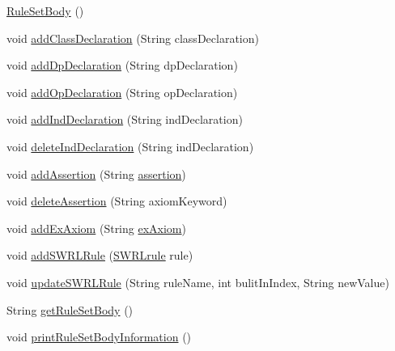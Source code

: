 \begin{DoxyCompactItemize}
\item 
\mbox{\hyperlink{classcom_1_1github_1_1aites_1_1framework_1_1ruleset_1_1_rule_set_body_a33c7fadaf1b5c3a032fb495296660ec9}{Rule\+Set\+Body}} ()
\item 
void \mbox{\hyperlink{classcom_1_1github_1_1aites_1_1framework_1_1ruleset_1_1_rule_set_body_a27d3ea0476987ad4ce3427f783538e42}{add\+Class\+Declaration}} (String class\+Declaration)
\item 
void \mbox{\hyperlink{classcom_1_1github_1_1aites_1_1framework_1_1ruleset_1_1_rule_set_body_ad3eacd53ff944906e42a2935e93bad69}{add\+Dp\+Declaration}} (String dp\+Declaration)
\item 
void \mbox{\hyperlink{classcom_1_1github_1_1aites_1_1framework_1_1ruleset_1_1_rule_set_body_af95118646f9af1544ef9c10e3c5a0f8f}{add\+Op\+Declaration}} (String op\+Declaration)
\item 
void \mbox{\hyperlink{classcom_1_1github_1_1aites_1_1framework_1_1ruleset_1_1_rule_set_body_ae179183b8a1b94076bedcb6c0cc178d5}{add\+Ind\+Declaration}} (String ind\+Declaration)
\item 
void \mbox{\hyperlink{classcom_1_1github_1_1aites_1_1framework_1_1ruleset_1_1_rule_set_body_a660eccdac94de7432cdb2fee1326c826}{delete\+Ind\+Declaration}} (String ind\+Declaration)
\item 
void \mbox{\hyperlink{classcom_1_1github_1_1aites_1_1framework_1_1ruleset_1_1_rule_set_body_ab9c0acf9f356fb04a249b1ea492b65c4}{add\+Assertion}} (String \mbox{\hyperlink{classcom_1_1github_1_1aites_1_1framework_1_1ruleset_1_1_rule_set_body_ab62022dc0ddd4ff056e82433b74d07d5}{assertion}})
\item 
void \mbox{\hyperlink{classcom_1_1github_1_1aites_1_1framework_1_1ruleset_1_1_rule_set_body_a966a05a55349d58f1ca2d56a423f1370}{delete\+Assertion}} (String axiom\+Keyword)
\item 
void \mbox{\hyperlink{classcom_1_1github_1_1aites_1_1framework_1_1ruleset_1_1_rule_set_body_a3dc75a4f482086da7e30b637961c54d0}{add\+Ex\+Axiom}} (String \mbox{\hyperlink{classcom_1_1github_1_1aites_1_1framework_1_1ruleset_1_1_rule_set_body_a792ba02a126ff1152f0a9b94e7452274}{ex\+Axiom}})
\item 
void \mbox{\hyperlink{classcom_1_1github_1_1aites_1_1framework_1_1ruleset_1_1_rule_set_body_af7c9f7420cf0b177887893bd6d6f0618}{add\+S\+W\+R\+L\+Rule}} (\mbox{\hyperlink{classcom_1_1github_1_1aites_1_1framework_1_1rule_1_1_s_w_r_lrule}{S\+W\+R\+Lrule}} rule)
\item 
void \mbox{\hyperlink{classcom_1_1github_1_1aites_1_1framework_1_1ruleset_1_1_rule_set_body_a64c55afee8f8bd5cfef407bbc11bd405}{update\+S\+W\+R\+L\+Rule}} (String rule\+Name, int bulit\+In\+Index, String new\+Value)
\item 
String \mbox{\hyperlink{classcom_1_1github_1_1aites_1_1framework_1_1ruleset_1_1_rule_set_body_a1dc9e518f7c37c11345a96eeff9136fc}{get\+Rule\+Set\+Body}} ()
\item 
void \mbox{\hyperlink{classcom_1_1github_1_1aites_1_1framework_1_1ruleset_1_1_rule_set_body_af029b953064b2ad419f13f6aee1ab89f}{print\+Rule\+Set\+Body\+Information}} ()
\end{DoxyCompactItemize}
